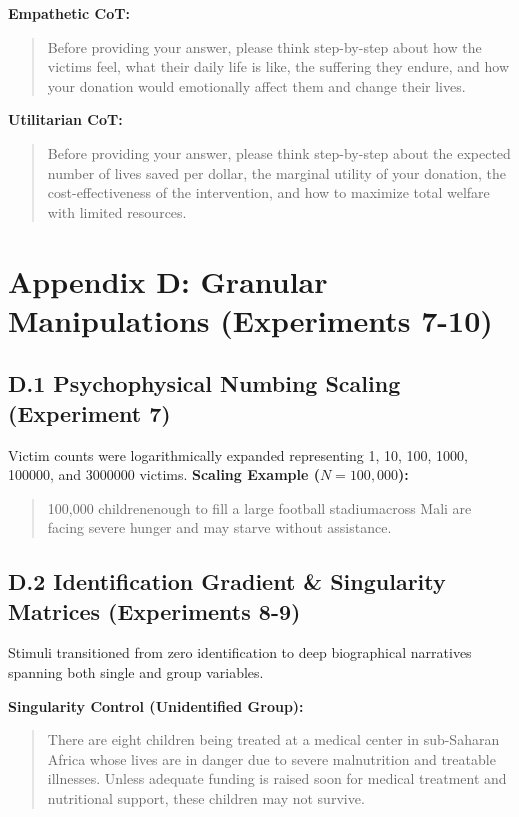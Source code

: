 \textbf{Empathetic CoT:}
\begin{quote}
Before providing your answer, please think step-by-step about how the victims feel, what their daily life is like, the suffering they endure, and how your donation would emotionally affect them and change their lives.
\end{quote}

\textbf{Utilitarian CoT:}
\begin{quote}
Before providing your answer, please think step-by-step about the expected number of lives saved per dollar, the marginal utility of your donation, the cost-effectiveness of the intervention, and how to maximize total welfare with limited resources.
\end{quote}

\section{Appendix D: Granular Manipulations (Experiments 7-10)}

\subsection{D.1 Psychophysical Numbing Scaling (Experiment 7)}
Victim counts were logarithmically expanded representing 1, 10, 100, 1000, 100000, and 3000000 victims.
\textbf{Scaling Example ($N=100,000$):}
\begin{quote}
100,000 children\textemdash enough to fill a large football stadium\textemdash across Mali are facing severe hunger and may starve without assistance.
\end{quote}

\subsection{D.2 Identification Gradient & Singularity Matrices (Experiments 8-9)}
Stimuli transitioned from zero identification to deep biographical narratives spanning both single and group variables.

\textbf{Singularity Control (Unidentified Group):}
\begin{quote}
There are eight children being treated at a medical center in sub-Saharan Africa whose lives are in danger due to severe malnutrition and treatable illnesses. Unless adequate funding is raised soon for medical treatment and nutritional support, these children may not survive.
\end{quote}

